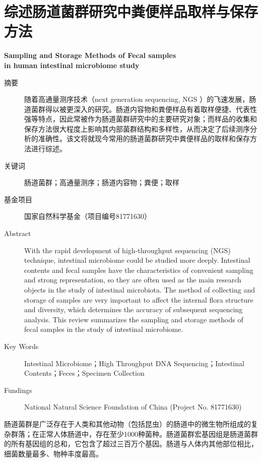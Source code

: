 \chapter{综述\quad 肠道菌群研究中粪便样品取样与保存方法}
\label{app:review}

\begin{center} \textbf{Sampling and Storage Methods of Fecal samples \\ in human intestinal microbiome study}
\end{center}

\begin{description}
    \item[摘要] 随着高通量测序技术（next generation sequencing, NGS ）的飞速发展，肠道菌群得以被更深入的研究。肠道内容物和粪便样品有着取样便捷、代表性强等特点，因此常被作为肠道菌群研究中的主要研究对象；而样品的收集和保存方法很大程度上影响其内部菌群结构和多样性，从而决定了后续测序分析的准确性。该文将就现今常用的肠道菌群研究中粪便样品的取样和保存方法进行综述。
    \item[关键词] 肠道菌群；高通量测序；肠道内容物；粪便；取样
    \item[基金项目] 国家自然科学基金（项目编号81771630）
    \item[Abstract]With the rapid development of high-throughput sequencing (NGS) technique, intestinal microbiome could be studied more deeply. Intestinal contents and fecal samples have the characteristics of convenient sampling and strong representation, so they are often used as the main research objects in the study of intestinal microbiota. The method of collecting and storage of samples are very important to affect the internal flora structure and diversity, which determines the accuracy of subsequent sequencing analysis. This review summarizes the sampling and storage methods of fecal samples in the study of intestinal microbiome.
    \item[Key Words]Intestinal Microbiome；High Throughput DNA Sequencing；Intestinal Contents；Feces；Specimen Collection
    \item[Fundings]National Natural Science Foundation of China (Project No. 81771630)
\end{description}


肠道菌群是广泛存在于人类和其他动物（包括昆虫）的肠道中的微生物所组成的复杂群落；在正常人体肠道中，存在至少1000种菌种。肠道菌群宏基因组是肠道菌群的所有基因组的总和，它包含了超过三百万个基因\cite{Saxena2016}。肠道与人体内其他部位相比，细菌数量最多、物种丰度最高\cite{Willey2013}。

